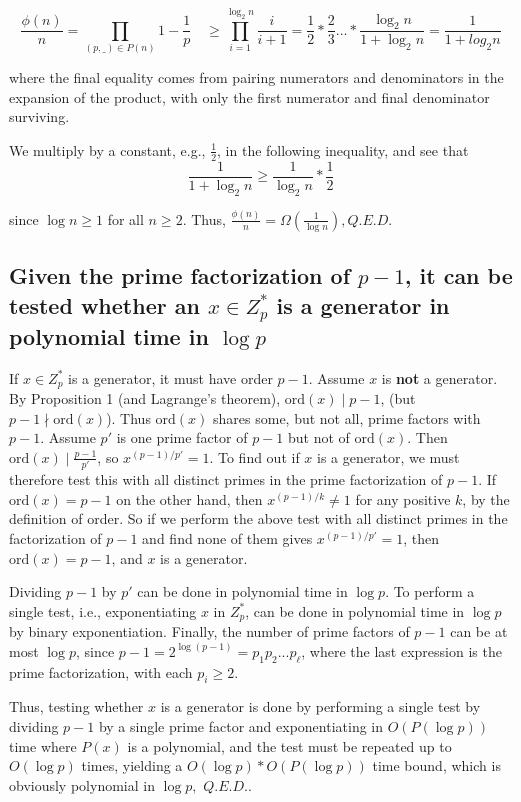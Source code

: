 \documentclass{article}
\newcommand{\z}[1]{Z^*_{#1}}
\newcommand{\ord}{\text{ord}}
\begin{document}
$$ \frac{\phi(n)}{n} = \prod_{(p,\_) \in P(n)}1 - \frac{1}{p} \quad \geq
\prod_{i=1}^{\log_2 n} \frac{i}{i+1} = \frac{1}{2}*\frac{2}{3} \dots * \frac{\log
  _2 n}{1 + \log_2 n } = \frac{1}{1 + log_2 n} $$

\noindent where the final equality comes from pairing numerators and
denominators in the expansion of the product, with only the first numerator and
final denominator surviving.

We multiply by a constant, e.g., $\frac{1}{2}$, in the following inequality, and
see that $$\frac{1}{1 + \log_2 n} \geq \frac{1}{\log_2 n}* \frac{1}{2} $$

\noindent since $\log n \geq 1$ for all $n \geq 2$. Thus, $\frac{\phi(n)}{n} =
\Omega\left( \frac{1}{\log n} \right), Q.E.D.$


\subsection{Given the prime factorization of $p-1$, it can be tested whether an
  $x \in \z p$ is a generator in polynomial time in $\log p$}

If $x \in \z p$ is a generator, it must have order $p -1$. Assume $x$ is
\textbf{not} a generator. By Proposition 1 (and Lagrange's theorem), $\ord(x)
\mid p - 1$, (but $p-1 \nmid \ord(x)$). Thus $\ord(x)$ shares some, but not all,
prime factors with $p-1$. Assume $p'$ is one prime factor of $p -1$ but not of
$\ord(x)$. Then $\ord(x) \mid \frac{p-1}{p'}$, so $x^{(p-1)/p'} = 1$. To find out
if $x$ is a generator, we must therefore test this with all distinct primes in
the prime factorization of $p-1$. If $\ord(x) = p-1$ on the other hand, then
$x^{(p-1)/k} \not = 1$ for any positive $k$, by the definition of order. So if
we perform the above test with all distinct primes in the factorization of $p-1$
and find none of them gives $x^{(p-1)/p'} = 1$, then $\ord(x) = p-1$, and $x$ is
a generator.

Dividing $p-1$ by $p'$ can be done in polynomial time in $\log p$. To perform a
single test, i.e., exponentiating $x$ in $\z p$, can be done in polynomial time
in $\log p$ by binary exponentiation. Finally, the number of prime factors of
$p-1$ can be at most $\log p$, since $p-1= 2^{\log (p-1)}=p_1p_2...p_\ell$,
where the last expression is the prime factorization, with each $p_i \geq 2$.

Thus, testing whether $x$ is a generator is done by performing a single test by
dividing $p-1$ by a single prime factor and exponentiating in $O(P(\log p))$
time where $P(x)$ is a polynomial, and the test must be repeated up to $O(\log
p)$ times, yielding a $O(\log p) * O(P(\log p))$ time bound, which is obviously
polynomial in $\log p,$ $Q.E.D.$.
\end{document}
